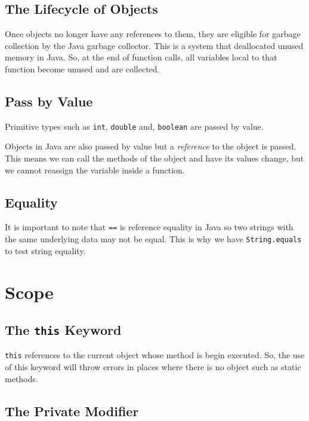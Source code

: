 \documentclass[a4paper, 12pt, twoside]{article}
\begin{document}
\subsection{The Lifecycle of Objects}

Once objects no longer have any references to them, they are
eligible for garbage collection by the Java garbage collector.
This is a system that deallocated unused memory in Java. So,
at the end of function calls, all variables local to that function
become unused and are collected.

\subsection{Pass by Value}

Primitive types such as \texttt{int}, \texttt{double} and, 
\texttt{boolean} are passed by value.

\vspace{\baselineskip}

Objects in Java are also passed by value but a \textit{reference}
to the object is passed. This means we can call the methods of the
object and have its values change, but we cannot reassign the
variable inside a function.

\subsection{Equality}

It is important to note that \texttt{==} is reference equality
in Java so two strings with the same underlying data may not
be equal. This is why we have \texttt{String.equals} to test
string equality.

\newpage

\section{Scope}

\subsection{The \texttt{this} Keyword}

\texttt{this} references to the current object whose method
is begin executed. So, the use of this keyword will throw
errors in places where there is no object such as static methods.

\subsection{The Private Modifier}
\end{document}
